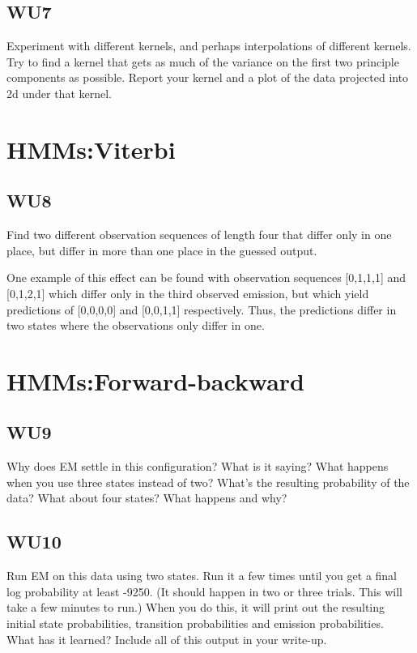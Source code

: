 \documentclass[a4paper,11pt]{article}
\begin{document}
\subsection{WU7}
\textsf{Experiment with different kernels, and perhaps interpolations 
of different kernels. Try to find a kernel that gets as much of the 
variance on the first two principle components as possible. Report your 
kernel and a plot of the data projected into 2d under that kernel.}\vspace{0.1in}

\pagebreak
\section{HMMs:Viterbi}
\subsection{WU8}
\textsf{Find two different observation sequences of length four that
differ only in one place, but differ in more than one place in the
guessed output.}\vspace{0.1in}


One example of this effect can be found with observation sequences
[0,1,1,1] and [0,1,2,1] which differ only in the third observed emission,
but which yield predictions of [0,0,0,0] and [0,0,1,1] respectively.
Thus, the predictions differ in two states where the observations only
differ in one.

\section{HMMs:Forward-backward}
\subsection{WU9}
\textsf{Why does EM settle in this configuration? What is it saying? 
What happens when you use three states instead of two? 
What's the resulting probability of the data? 
What about four states? What happens and why?}\vspace{0.1in}

\subsection{WU10}
\textsf{Run EM on this data using two states. 
Run it a few times until you get a final log probability at least -9250. 
(It should happen in two or three trials. This will take a few minutes to run.) 
When you do this, it will print out the resulting initial state probabilities, 
transition probabilities and emission probabilities. 
What has it learned? Include all of this output in your write-up.}\vspace{0.1in}
\end{document}
